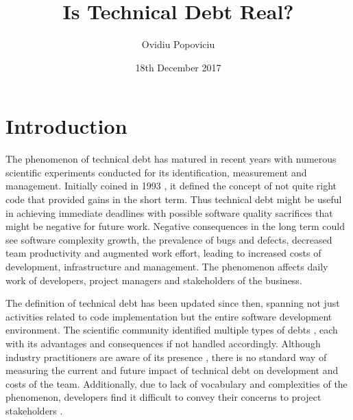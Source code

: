 \documentclass{mprop}
\begin{document}
\title{Is Technical Debt Real?}
\author{Ovidiu Popoviciu}
\date{18th December 2017}
\maketitle

\tableofcontents 
\newpage

\section{Introduction}
\label{intro}

The phenomenon of technical debt has matured in recent years with numerous
scientific experiments conducted for its identification, measurement and
management. Initially coined in 1993 \cite{Cunningham1993}, it defined the
concept of not quite right code that provided gains in the short term. Thus
technical debt might be useful in achieving immediate deadlines with possible
software quality sacrifices that might be negative for future work. Negative
consequences in the long term could see software complexity growth, the
prevalence of bugs and defects, decreased team productivity and augmented work
effort, leading to increased costs of development, infrastructure and
management. The phenomenon affects daily work of developers, project managers
and stakeholders of the business. 

The definition of technical debt has been updated since then, spanning not just
activities related to code implementation but the entire software development
environment. The scientific community identified multiple types of debts
\cite{Li2015}, each with its advantages and consequences if not handled
accordingly. Although industry practitioners are aware of its presence
\cite{Codabux2013} \cite{Lim2012}, there is no standard way of measuring the
current and future impact of technical debt on development and costs of the
team. Additionally, due to lack of vocabulary and complexities of the
phenomenon, developers find it difficult to convey their concerns to project
stakeholders \cite{Kruchten2012}.
\end{document}
